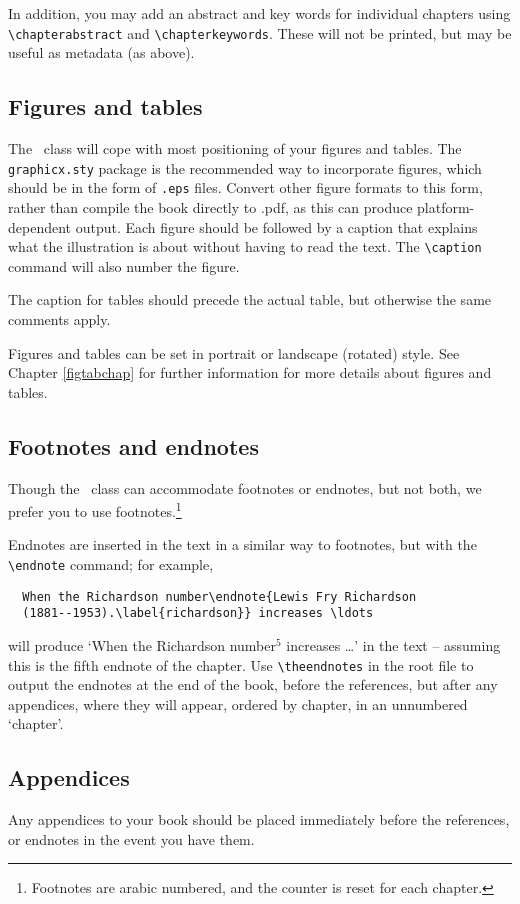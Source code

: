 In addition, you may add an abstract and key words for individual chapters using \verb"\chapterabstract" and \verb"\chapterkeywords". These will not be printed, but may be useful as metadata (as above).

\subsection{Figures and tables}

The \cambridge\ class will cope with most positioning of your figures and tables.
The \verb"graphicx.sty" package is the recommended way to incorporate figures,
which should be in the form of \verb".eps" files. Convert other figure formats
to this form, rather than compile the book directly to .pdf, as this can produce
platform-dependent output. Each figure should be followed by a caption that
explains what the illustration is about  without having to read the text. The \verb"\caption"
command will also number the figure.

The caption for tables should precede the actual table, but otherwise the same comments apply.

Figures and tables can be set in portrait or landscape (rotated) style. See Chapter \ref{figtabchap}
for further information for more details about figures and tables.

\subsection{Footnotes and endnotes}
Though the \cambridge\ class can accommodate footnotes or endnotes, but not both, we prefer
you to use footnotes.\footnote{Footnotes are arabic numbered, and the counter is reset for each chapter.}

Endnotes are inserted in the text in a similar way to footnotes, but with the \verb"\endnote" command; for example,
\begin{verbatim}
  When the Richardson number\endnote{Lewis Fry Richardson
  (1881--1953).\label{richardson}} increases \ldots
\end{verbatim}
will produce `When the Richardson number$^5$ increases \ldots' in the text --
assuming this is the fifth endnote of the chapter. Use \verb"\theendnotes"  in the root
file to output
 the endnotes at the end of the book, before the references, but after any appendices,
where they will appear, ordered by chapter, in an unnumbered `chapter'.

\subsection{Appendices}
Any appendices to your book should be placed immediately before the references,
or endnotes in the event you have them.

